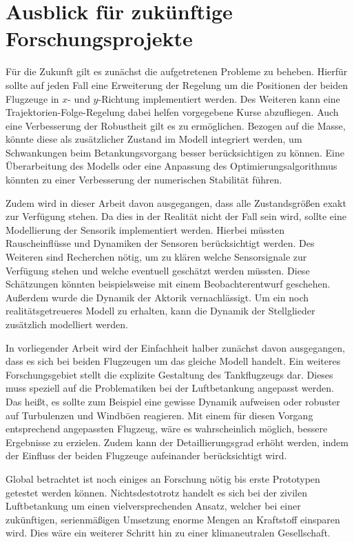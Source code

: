 \section{Ausblick für zukünftige Forschungsprojekte}
Für die Zukunft gilt es zunächst die aufgetretenen Probleme zu beheben. Hierfür sollte auf jeden Fall eine Erweiterung der Regelung um die Positionen der beiden Flugzeuge in $x$- und $y$-Richtung implementiert werden. Des Weiteren kann eine Trajektorien-Folge-Regelung dabei helfen vorgegebene Kurse abzufliegen.
Auch eine Verbesserung der Robustheit gilt es zu ermöglichen. Bezogen auf die Masse, könnte diese als zusätzlicher Zustand im Modell integriert werden, um Schwankungen beim Betankungsvorgang besser berücksichtigen zu können. Eine Überarbeitung des Modells oder eine Anpassung des Optimierungsalgorithmus könnten zu einer Verbesserung der numerischen Stabilität führen.

Zudem wird in dieser Arbeit davon ausgegangen, dass alle Zustandsgrößen exakt zur Verfügung stehen. Da dies in der Realität nicht der Fall sein wird, sollte eine Modellierung der Sensorik implementiert werden. Hierbei müssten Rauscheinflüsse und Dynamiken der Sensoren berücksichtigt werden. Des Weiteren sind Recherchen nötig, um zu klären welche Sensorsignale zur Verfügung stehen und welche eventuell geschätzt werden müssten. Diese Schätzungen könnten beispielsweise mit einem Beobachterentwurf geschehen. Außerdem wurde die Dynamik der Aktorik vernachlässigt. Um ein noch realitätsgetreueres Modell zu erhalten, kann die Dynamik der Stellglieder zusätzlich modelliert werden.

In vorliegender Arbeit wird der Einfachheit halber zunächst davon ausgegangen, dass es sich bei beiden Flugzeugen um das gleiche Modell handelt. Ein weiteres Forschungsgebiet stellt die explizite Gestaltung des Tankflugzeugs dar. Dieses muss speziell auf die Problematiken bei der Luftbetankung angepasst werden. Das heißt, es sollte zum Beispiel eine gewisse Dynamik aufweisen oder robuster auf Turbulenzen und Windböen reagieren. Mit einem für diesen Vorgang entsprechend angepassten Flugzeug, wäre es wahrscheinlich möglich, bessere Ergebnisse zu erzielen. Zudem kann der Detaillierungsgrad erhöht werden, indem der Einfluss der beiden Flugzeuge aufeinander berücksichtigt wird. 

Global betrachtet ist noch einiges an Forschung nötig bis erste Prototypen getestet werden können. Nichtsdestotrotz handelt es sich bei der zivilen Luftbetankung um einen vielversprechenden Ansatz, welcher bei einer zukünftigen, serienmäßigen Umsetzung enorme Mengen an Kraftstoff einsparen wird. Dies wäre ein weiterer Schritt hin zu einer klimaneutralen Gesellschaft.

